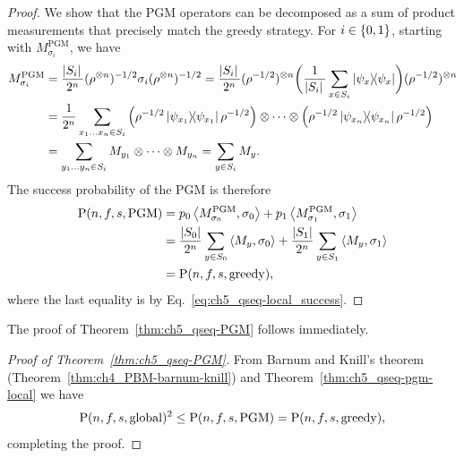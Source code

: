 \begin{proof}
    We show that the PGM operators can be decomposed as a sum of product measurements that precisely match the greedy strategy.
    For $i \in \{ 0, 1 \}$, starting with $M_{\sigma_i}^{\text{PGM}}$, we have
    \begin{equation}
    \begin{aligned}
        M_{\sigma_i}^{\text{PGM}}
        &= \frac{\abs*{S_i}}{2^n} (\rho^{\otimes n})^{-1/2} \sigma_i (\rho^{\otimes n})^{-1/2}
        = \frac{\abs*{S_i}}{2^n} (\rho^{-1/2})^{\otimes n} \biggl(\frac{1}{\abs*{S_i}} \sum_{x \in S_i} \ketbra{\psi_x}\biggr) (\rho^{-1/2})^{\otimes n} \\
        &= \frac{1}{2^n} \sum_{x_1\ldots x_n \in S_i} \left(\rho^{-1/2} \ketbra{\psi_{x_1}} \rho^{-1/2}\right) \otimes \cdots \otimes \left(\rho^{-1/2} \ketbra{\psi_{x_n}} \rho^{-1/2}\right) \\
        &= \sum_{y_1 \ldots y_n \in S_i} M_{y_1} \otimes \cdots \otimes M_{y_n}
        = \sum_{y \in S_i} M_y.
    \end{aligned}
    \end{equation}
    The success probability of the PGM is therefore
    \begin{equation}\label{eq:ch5_qseq-local=pgm}
    \begin{aligned}
        \operatorname{P}(n,f,s,\mathrm{PGM}) &= p_0 \left\langle M_{\sigma_0}^{\text{PGM}}, \sigma_0 \right\rangle + p_1 \left\langle M_{\sigma_1}^{\text{PGM}}, \sigma_1 \right\rangle \\
        &= \frac{\abs{S_0}}{2^n} \sum_{y \in S_0} \left\langle M_y, \sigma_0 \right\rangle + \frac{\abs{S_1}}{2^n} \sum_{y \in S_1} \left\langle M_y, \sigma_1 \right\rangle \\
        &= \operatorname{P}(n,f,s,\mathrm{greedy}),
    \end{aligned}
    \end{equation}
    where the last equality is by Eq.~\eqref{eq:ch5_qseq-local_success}.
\end{proof}
The proof of Theorem~\ref{thm:ch5_qseq-PGM} follows immediately.
\begin{proof}[Proof of Theorem~\ref{thm:ch5_qseq-PGM}]
    From Barnum and Knill's theorem (Theorem~\ref{thm:ch4_PBM-barnum-knill}) and Theorem~\ref{thm:ch5_qseq-pgm-local} we have
    \begin{equation}
        \operatorname{P}(n,f,s,\mathrm{global})^2 \leq \operatorname{P}(n,f,s,\mathrm{PGM}) = \operatorname{P}(n,f,s,\mathrm{greedy}),
    \end{equation}
    completing the proof.
\end{proof}

